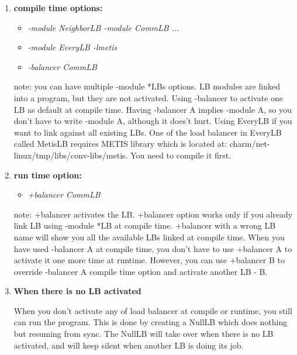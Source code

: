 \begin{enumerate}
\item {\bf compile time options:}

\begin{itemize}
\item {\em -module NeighborLB -module CommLB ...}
\item {\em -module EveryLB -lmetis}
\item {\em -balancer CommLB}
\end{itemize}

note:
you can have multiple -module *LBs options. LB modules are
linked into a program, but they are not activated.
Using -balancer to activate one LB as default at compile time. Having -balancer A implies -module A, so you don't have to write -module A, although it does't hurt.
Using EveryLB if you want to link against all existing LBs. One of the load balancer in EveryLB called MetisLB requires METIS library which is located at: charm/net-linux/tmp/libs/conv-libs/metis. You need to compile it first.

\item {\bf run time option:}

\begin{itemize}
\item {\em +balancer CommLB}
\end{itemize}

note:
+balancer activates the LB. +balancer option works only if you already link LB using -module *LB at compile time. +balancer with a wrong LB name will show you all the available LBs linked at compile time.
When you have used -balancer A at compile time, you don't have to use +balancer A to activate it one more time at runtime. However, you can use +balancer B to override -balancer A compile time option and activate another LB - B.

\item {\bf When there is no LB activated}

When you don't activate any of load balancer at compile or runtime, you still 
can run the program. This is done by creating a NullLB which does nothing 
but resuming from sync. The NullLB will take over when there is
no LB activated, and will keep silent when another LB is doing its job. 

\end{enumerate}


